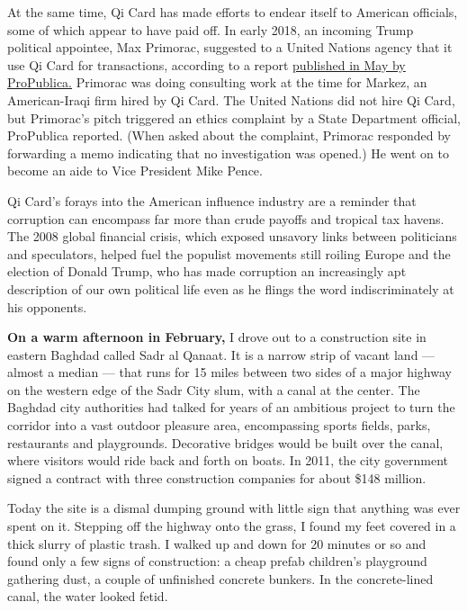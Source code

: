 At the same time, Qi Card has made efforts to endear itself to American
officials, some of which appear to have paid off. In early 2018, an
incoming Trump political appointee, Max Primorac, suggested to a United
Nations agency that it use Qi Card for transactions, according to a
report
\href{https://www.propublica.org/article/pences-special-envoy-in-foreign-aid-office-sparked-an-ethics-complaint-just-weeks-after-he-started-his-job}{published
in May by ProPublica.} Primorac was doing consulting work at the time
for Markez, an American-Iraqi firm hired by Qi Card. The United Nations
did not hire Qi Card, but Primorac's pitch triggered an ethics complaint
by a State Department official, ProPublica reported. (When asked about
the complaint, Primorac responded by forwarding a memo indicating that
no investigation was opened.) He went on to become an aide to Vice
President Mike Pence.

Qi Card's forays into the American influence industry are a reminder
that corruption can encompass far more than crude payoffs and tropical
tax havens. The 2008 global financial crisis, which exposed unsavory
links between politicians and speculators, helped fuel the populist
movements still roiling Europe and the election of Donald Trump, who has
made corruption an increasingly apt description of our own political
life even as he flings the word indiscriminately at his opponents.

\textbf{On a warm afternoon in February,} I drove out to a construction
site in eastern Baghdad called Sadr al Qanaat. It is a narrow strip of
vacant land --- almost a median --- that runs for 15 miles between two
sides of a major highway on the western edge of the Sadr City slum, with
a canal at the center. The Baghdad city authorities had talked for years
of an ambitious project to turn the corridor into a vast outdoor
pleasure area, encompassing sports fields, parks, restaurants and
playgrounds. Decorative bridges would be built over the canal, where
visitors would ride back and forth on boats. In 2011, the city
government signed a contract with three construction companies for about
\$148 million.

Today the site is a dismal dumping ground with little sign that anything
was ever spent on it. Stepping off the highway onto the grass, I found
my feet covered in a thick slurry of plastic trash. I walked up and down
for 20 minutes or so and found only a few signs of construction: a cheap
prefab children's playground gathering dust, a couple of unfinished
concrete bunkers. In the concrete-lined canal, the water looked fetid.

